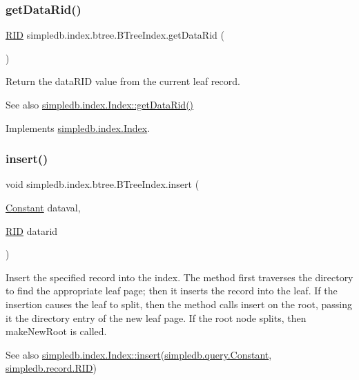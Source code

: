 \subsubsection{\texorpdfstring{get\+Data\+Rid()}{getDataRid()}}
{\footnotesize\ttfamily \hyperlink{classsimpledb_1_1record_1_1RID}{R\+ID} simpledb.\+index.\+btree.\+B\+Tree\+Index.\+get\+Data\+Rid (\begin{DoxyParamCaption}{ }\end{DoxyParamCaption})\hspace{0.3cm}{\ttfamily [inline]}}

Return the data\+R\+ID value from the current leaf record. \begin{DoxySeeAlso}{See also}
\hyperlink{interfacesimpledb_1_1index_1_1Index_aad4ee85740a0f5b3453bdf24e8b82615}{simpledb.\+index.\+Index\+::get\+Data\+Rid()} 
\end{DoxySeeAlso}


Implements \hyperlink{interfacesimpledb_1_1index_1_1Index_aad4ee85740a0f5b3453bdf24e8b82615}{simpledb.\+index.\+Index}.

\mbox{\label{classsimpledb_1_1index_1_1btree_1_1BTreeIndex_a74ac0fcec24483159ab82ac47d7bc790}} 
\subsubsection{\texorpdfstring{insert()}{insert()}}
{\footnotesize\ttfamily void simpledb.\+index.\+btree.\+B\+Tree\+Index.\+insert (\begin{DoxyParamCaption}\item[{\hyperlink{classsimpledb_1_1query_1_1Constant}{Constant}}]{dataval,  }\item[{\hyperlink{classsimpledb_1_1record_1_1RID}{R\+ID}}]{datarid }\end{DoxyParamCaption})\hspace{0.3cm}{\ttfamily [inline]}}

Insert the specified record into the index. The method first traverses the directory to find the appropriate leaf page; then it inserts the record into the leaf. If the insertion causes the leaf to split, then the method calls insert on the root, passing it the directory entry of the new leaf page. If the root node splits, then make\+New\+Root is called. \begin{DoxySeeAlso}{See also}
\hyperlink{interfacesimpledb_1_1index_1_1Index_a7e72ba9fe47d6d7631e0ad3feee882d7}{simpledb.\+index.\+Index\+::insert}(\hyperlink{classsimpledb_1_1query_1_1Constant}{simpledb.\+query.\+Constant}, \hyperlink{classsimpledb_1_1record_1_1RID}{simpledb.\+record.\+R\+ID}) 
\end{DoxySeeAlso}


